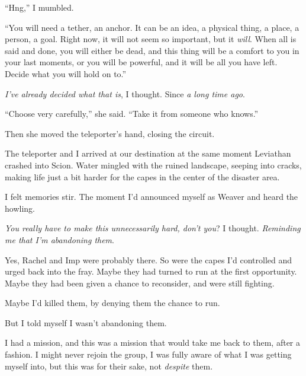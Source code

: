 ``Hng,'' I mumbled.



``You will need a tether, an anchor.  It can be an idea, a physical thing, a place, a person, a goal.  Right now, it will not seem so important, but it \emph{will}.  When all is said and done, you will either be dead, and this thing will be a comfort to you in your last moments, or you will be powerful, and it will be all you have left.  Decide what you will hold on to.''



\emph{I've already decided what that is}, I thought.  Since \emph{a long time ago}.



``Choose very carefully,'' she said.  ``Take it from someone who knows.''



Then she moved the teleporter's hand, closing the circuit.



The teleporter and I arrived at our destination at the same moment Leviathan crashed into Scion.  Water mingled with the ruined landscape, seeping into cracks, making life just a bit harder for the capes in the center of the disaster area.



I felt memories stir.  The moment I'd announced myself as Weaver and heard the howling.



\emph{You really have to make this unnecessarily hard, don't you}?  I thought.  \emph{Reminding me that I'm abandoning them}.



Yes, Rachel and Imp were probably there.  So were the capes I'd controlled and urged back into the fray.  Maybe they had turned to run at the first opportunity.  Maybe they had been given a chance to reconsider, and were still fighting.



Maybe I'd killed them, by denying them the chance to run.



But I told myself I wasn't abandoning them.



I had a mission, and this was a mission that would take me back to them, after a fashion.  I might never rejoin the group, I was fully aware of what I was getting myself into, but this was for their sake, not \emph{despite} them.



